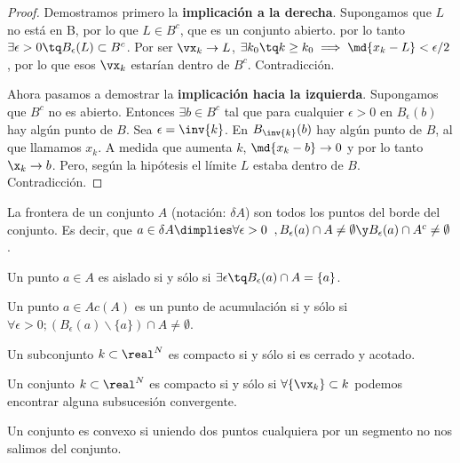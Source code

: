 \documentclass[12pt,a4paper,titlepage]{apuntes}
\begin{document}
\begin{proof}
Demostramos primero la \textbf{implicación a la derecha}. Supongamos que $L$ no está en B, por lo que $L\in B^c$, que es un conjunto abierto. por lo tanto $\exists \epsilon >0 \tq B_\epsilon(L)\subset B^c$. Por ser $\vx_k \to L$, $\exists k_0 \tq k\geq k_0 \implies \md{x_k-L}<\epsilon / 2$, por lo que esos $\vx_k$ estarían dentro de $B^c$. Contradicción.

Ahora pasamos a demostrar la \textbf{implicación hacia la izquierda}. Supongamos que $B^c$ no es abierto. Entonces $\exists b \in B^c$ tal que para cualquier $\epsilon>0$ en $B_\epsilon(b)$ hay algún punto de $B$. Sea $\epsilon = \inv{k}$. En $B_\inv{k}(b)$ hay algún punto de $B$, al que llamamos $x_k$. A medida que aumenta $k$, $\md{x_k-b} \to 0$ y por lo tanto $\x_k \to b$. Pero, según la hipótesis el límite $L$  estaba dentro de $B$. Contradicción.
\end{proof}

\begin{defn}[Frontera] La frontera de un conjunto $A$ (notación: $\delta A$) son todos los puntos del borde del conjunto. Es decir, que $a\in \delta A \dimplies \forall \epsilon > 0\;\; , B_\epsilon(a) \cap A \neq \emptyset \y B_\epsilon(a) \cap A^c \neq \emptyset$.\end{defn}

\begin{defn} Un punto $a\in A$ es aislado si y sólo si $\exists \epsilon \tq B_\epsilon(a)\cap A =\{a\}$.\end{defn}

\begin{defn} Un punto $a\in Ac(A)$ es un punto de acumulación si y sólo si $\forall \epsilon > 0; (B_\epsilon(a) \backslash \{a\})\cap A \neq \emptyset$.\end{defn}

\begin{defn} Un subconjunto $k\subset \real^N$ es compacto si y sólo si es cerrado y acotado.\end{defn}

\begin{theorem} Un conjunto $k\subset \real^N$ es compacto si y sólo si $\forall \{\vx_k\} \subset k$ podemos encontrar alguna subsucesión convergente.\end{theorem}

\begin{defn} Un conjunto es convexo si uniendo dos puntos cualquiera por un segmento no nos salimos del conjunto.\end{defn}
\end{document}

